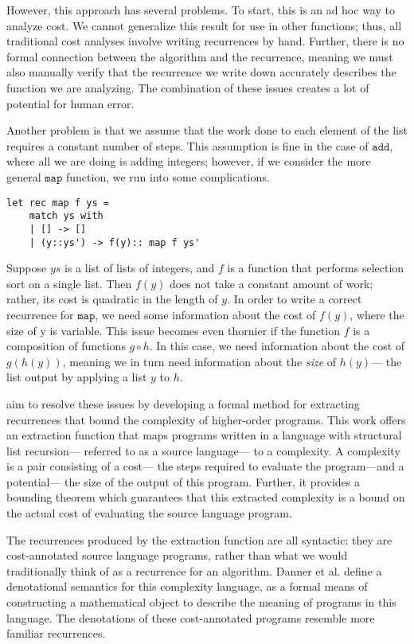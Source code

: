 However, this approach has several problems. To start, this is an ad hoc way to analyze cost. We cannot generalize
this result for use in other functions; thus, all traditional cost analyses involve writing recurrences by hand. Further, there is 
no formal connection between the algorithm and the recurrence, meaning we must also manually verify that the recurrence
we write down accurately describes the function we are analyzing. The combination of these issues creates a lot of potential
for human error.

Another problem is that we assume that the work done to each element of the list requires a constant number of steps. 
This assumption is fine in the case of $\texttt{add}$, where all we are doing is adding integers; however, if we consider
the more general $\texttt{map}$ function, we run into some complications. 
\begin{verbatim}
let rec map f ys =
	match ys with
	| [] -> []
	| (y::ys') -> f(y):: map f ys'
\end{verbatim}
Suppose $ys$ is a list of lists of integers, and $f$ is a function that performs selection sort on a single list. Then $f(y)$ does
not take a constant amount of work; rather, its cost is quadratic in the length of $y$. In order to write a correct recurrence
for $\texttt{map}$, we need some information about the cost of $f(y)$, where the size of y is variable. This issue
becomes even thornier if the function $f$ is a composition of functions $g \circ h$. In this case, we need information about the cost of $g(h(y))$, meaning we in turn need information about the \emph{size} of $h(y)$--- the list output by applying a list $y$ to $h$. 

\cite{N.-Danner:2015aa} aim to resolve these issues by developing a formal method for extracting
recurrences that bound the complexity of higher-order programs. This work offers an extraction function that maps programs written in a language with structural list recursion--- referred to as a source language--- to a complexity. A complexity is a pair consisting of a cost--- the steps required to evaluate the program---and a potential--- the size of the 
output of this program. Further, it provides a bounding theorem which guarantees that this extracted complexity is a 
bound on the actual cost of evaluating the source language program. 

The recurrences produced by the extraction function are all syntactic: they are cost-annotated source language
programs, rather than what we would traditionally think of as a recurrence for an algorithm. Danner et al. define a 
denotational semantics for this complexity language, as a formal means of constructing a mathematical object to
describe the meaning of programs in this language. The denotations of these cost-annotated programs resemble
more familiar recurrences.

